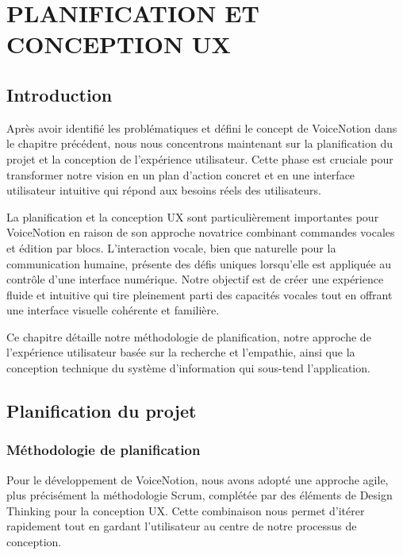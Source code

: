 
\chapter{PLANIFICATION ET CONCEPTION UX}

\section{Introduction}

Après avoir identifié les problématiques et défini le concept de VoiceNotion dans le chapitre précédent, nous nous concentrons maintenant sur la planification du projet et la conception de l'expérience utilisateur. Cette phase est cruciale pour transformer notre vision en un plan d'action concret et en une interface utilisateur intuitive qui répond aux besoins réels des utilisateurs.

La planification et la conception UX sont particulièrement importantes pour VoiceNotion en raison de son approche novatrice combinant commandes vocales et édition par blocs. L'interaction vocale, bien que naturelle pour la communication humaine, présente des défis uniques lorsqu'elle est appliquée au contrôle d'une interface numérique. Notre objectif est de créer une expérience fluide et intuitive qui tire pleinement parti des capacités vocales tout en offrant une interface visuelle cohérente et familière.

Ce chapitre détaille notre méthodologie de planification, notre approche de l'expérience utilisateur basée sur la recherche et l'empathie, ainsi que la conception technique du système d'information qui sous-tend l'application.

\section{Planification du projet}

\subsection{Méthodologie de planification}

Pour le développement de VoiceNotion, nous avons adopté une approche agile, plus précisément la méthodologie Scrum, complétée par des éléments de Design Thinking pour la conception UX. Cette combinaison nous permet d'itérer rapidement tout en gardant l'utilisateur au centre de notre processus de conception.


